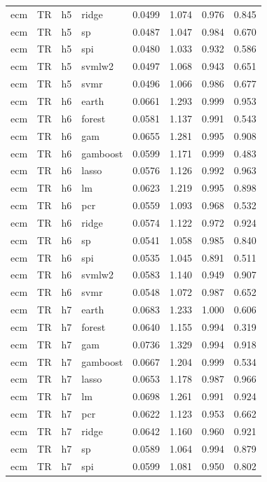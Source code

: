 \begin{ThreePartTable}
\begin{longtable}[t]{llclcccc}
ecm & TR & h5 & ridge & 0.0499 & 1.074 & 0.976 & 0.845\\
ecm & TR & h5 & sp & 0.0487 & 1.047 & 0.984 & 0.670\\
ecm & TR & h5 & spi & 0.0480 & 1.033 & 0.932 & 0.586\\
ecm & TR & h5 & svmlw2 & 0.0497 & 1.068 & 0.943 & 0.651\\
ecm & TR & h5 & svmr & 0.0496 & 1.066 & 0.986 & 0.677\\
\addlinespace
ecm & TR & h6 & earth & 0.0661 & 1.293 & 0.999 & 0.953\\
ecm & TR & h6 & forest & 0.0581 & 1.137 & 0.991 & 0.543\\
ecm & TR & h6 & gam & 0.0655 & 1.281 & 0.995 & 0.908\\
ecm & TR & h6 & gamboost & 0.0599 & 1.171 & 0.999 & 0.483\\
ecm & TR & h6 & lasso & 0.0576 & 1.126 & 0.992 & 0.963\\
ecm & TR & h6 & lm & 0.0623 & 1.219 & 0.995 & 0.898\\
ecm & TR & h6 & pcr & 0.0559 & 1.093 & 0.968 & 0.532\\
ecm & TR & h6 & ridge & 0.0574 & 1.122 & 0.972 & 0.924\\
ecm & TR & h6 & sp & 0.0541 & 1.058 & 0.985 & 0.840\\
ecm & TR & h6 & spi & 0.0535 & 1.045 & 0.891 & 0.511\\
ecm & TR & h6 & svmlw2 & 0.0583 & 1.140 & 0.949 & 0.907\\
ecm & TR & h6 & svmr & 0.0548 & 1.072 & 0.987 & 0.652\\
\addlinespace
ecm & TR & h7 & earth & 0.0683 & 1.233 & 1.000 & 0.606\\
ecm & TR & h7 & forest & 0.0640 & 1.155 & 0.994 & 0.319\\
ecm & TR & h7 & gam & 0.0736 & 1.329 & 0.994 & 0.918\\
ecm & TR & h7 & gamboost & 0.0667 & 1.204 & 0.999 & 0.534\\
ecm & TR & h7 & lasso & 0.0653 & 1.178 & 0.987 & 0.966\\
ecm & TR & h7 & lm & 0.0698 & 1.261 & 0.991 & 0.924\\
ecm & TR & h7 & pcr & 0.0622 & 1.123 & 0.953 & 0.662\\
ecm & TR & h7 & ridge & 0.0642 & 1.160 & 0.960 & 0.921\\
ecm & TR & h7 & sp & 0.0589 & 1.064 & 0.994 & 0.879\\
ecm & TR & h7 & spi & 0.0599 & 1.081 & 0.950 & 0.802\\

\end{longtable}
\end{ThreePartTable}
